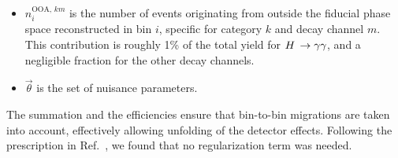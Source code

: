 \begin{itemize}
% 
% 
\item $n^{\text{OOA},\,km}_i $ is the number of events originating from outside the fiducial phase space reconstructed in bin $i$, specific for category $k$ and decay channel $m$.
% 
This contribution is roughly 1\% of the total yield for $H\,\to\gamma\gamma$, and a negligible fraction for the other decay channels.
% 
% 
\item $\vec{\theta}$ is the set of nuisance parameters.
\end{itemize}
% 
The summation and the efficiencies ensure that bin-to-bin migrations are taken into account, effectively allowing unfolding of the detector effects.
% 
% 
Following the prescription in Ref.~\cite{Hansen:LShape}, we found that no regularization term was needed.





